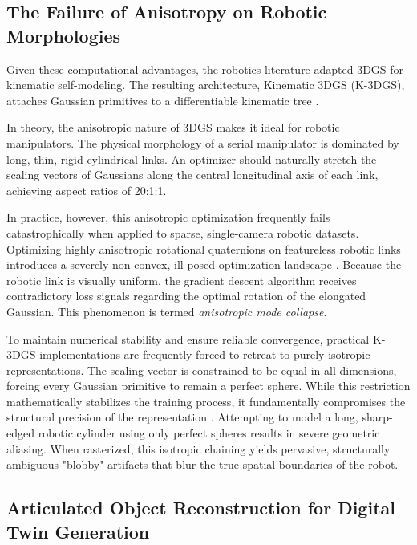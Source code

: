 \documentclass[12pt,a4paper,oneside]{report}
\begin{document}
\subsection{The Failure of Anisotropy on Robotic Morphologies}
\label{subsec:the_failure_of_anisotropy_on_robotic_morphologies}

Given these computational advantages, the robotics literature adapted 3DGS for kinematic self-modeling. The resulting architecture, Kinematic 3DGS (K-3DGS), attaches Gaussian primitives to a differentiable kinematic tree \cite{hu2025learning}.

In theory, the anisotropic nature of 3DGS makes it ideal for robotic manipulators. The physical morphology of a serial manipulator is dominated by long, thin, rigid cylindrical links. An optimizer should naturally stretch the scaling vectors of Gaussians along the central longitudinal axis of each link, achieving aspect ratios of 20:1:1.

In practice, however, this anisotropic optimization frequently fails catastrophically when applied to sparse, single-camera robotic datasets. Optimizing highly anisotropic rotational quaternions on featureless robotic links introduces a severely non-convex, ill-posed optimization landscape \cite{hu2025learning}. Because the robotic link is visually uniform, the gradient descent algorithm receives contradictory loss signals regarding the optimal rotation of the elongated Gaussian. This phenomenon is termed \textit{anisotropic mode collapse}.

To maintain numerical stability and ensure reliable convergence, practical K-3DGS implementations are frequently forced to retreat to purely isotropic representations. The scaling vector is constrained to be equal in all dimensions, forcing every Gaussian primitive to remain a perfect sphere. While this restriction mathematically stabilizes the training process, it fundamentally compromises the structural precision of the representation \cite{hu2025learning}. Attempting to model a long, sharp-edged robotic cylinder using only perfect spheres results in severe geometric aliasing. When rasterized, this isotropic chaining yields pervasive, structurally ambiguous "blobby" artifacts that blur the true spatial boundaries of the robot.


\subsection{Articulated Object Reconstruction for Digital Twin Generation}
\label{subsec:articulated_object_reconstruction_for_digital_twin_generation}
\end{document}
